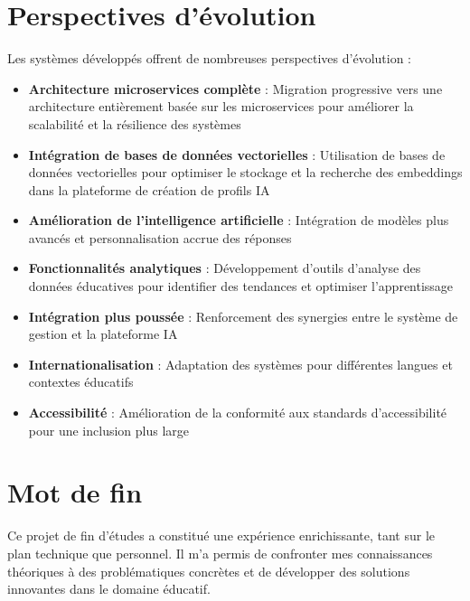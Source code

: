\documentclass[12pt, a4paper]{report}
\begin{document}
\section{Perspectives d'évolution}

Les systèmes développés offrent de nombreuses perspectives d'évolution :

\begin{itemize}
  \item \textbf{Architecture microservices complète} : Migration progressive vers une architecture entièrement basée sur les microservices pour améliorer la scalabilité et la résilience des systèmes
  
  \item \textbf{Intégration de bases de données vectorielles} : Utilisation de bases de données vectorielles pour optimiser le stockage et la recherche des embeddings dans la plateforme de création de profils IA
  
  \item \textbf{Amélioration de l'intelligence artificielle} : Intégration de modèles plus avancés et personnalisation accrue des réponses
  
  \item \textbf{Fonctionnalités analytiques} : Développement d'outils d'analyse des données éducatives pour identifier des tendances et optimiser l'apprentissage
  
  \item \textbf{Intégration plus poussée} : Renforcement des synergies entre le système de gestion et la plateforme IA
  
  \item \textbf{Internationalisation} : Adaptation des systèmes pour différentes langues et contextes éducatifs
  
  \item \textbf{Accessibilité} : Amélioration de la conformité aux standards d'accessibilité pour une inclusion plus large
\end{itemize}

\section{Mot de fin}

Ce projet de fin d'études a constitué une expérience enrichissante, tant sur le plan technique que personnel. Il m'a permis de confronter mes connaissances théoriques à des problématiques concrètes et de développer des solutions innovantes dans le domaine éducatif.
\end{document}
